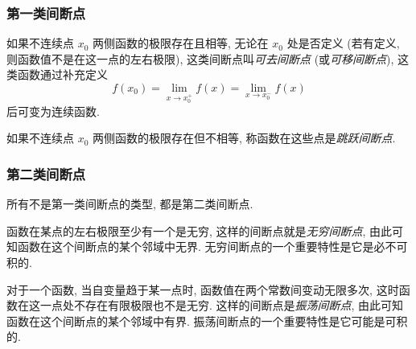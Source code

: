 \subsubsection{第一类间断点}

\begin{definition}[可去间断点]
    如果不连续点 $ x_{0} $ 两侧函数的极限存在且相等, 无论在 $ x_{0} $ 处是否定义
    (若有定义, 则函数值不是在这一点的左右极限),
    这类间断点叫\textit{可去间断点} (或\textit{可移间断点}), 这类函数通过补充定义
    $$f\left(x_{0}\right)=\lim _{x \rightarrow x_{0}^{+}} f(x)=\lim _{x \rightarrow x_{0}^{-}} f(x)$$
    后可变为连续函数.
\end{definition}

\begin{definition}[跳跃间断点]
    如果不连续点 $x_{0}$ 两侧函数的极限存在但不相等, 称函数在这些点是\textit{跳跃间断点}.
\end{definition}

\subsubsection{第二类间断点}

所有不是第一类间断点的类型, 都是第二类间断点.

\begin{definition}[无穷间断点]
    函数在某点的左右极限至少有一个是无穷, 这样的间断点就是\textit{无穷间断点}, 由此可知函数在这个间断点的某个邻域中无界. 无穷间断点的一个重要特性是它是必不可积的.
\end{definition}

\begin{definition}[振荡间断点]
    对于一个函数, 当自变量趋于某一点时, 函数值在两个常数间变动无限多次, 这时函数在这一点处不存在有限极限也不是无穷.
    这样的间断点是\textit{振荡间断点}, 由此可知函数在这个间断点的某个邻域中有界. 振荡间断点的一个重要特性是它可能是可积的.
\end{definition}

